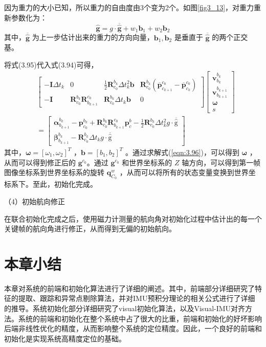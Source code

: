 因为重力的大小已知，所以重力的自由度由3个变为2个。如图\ref{fig3_13}，对重力重新参数化为：
\begin{equation}
\label{eqn:3.95}
\hat{\mathbf{g}} = g \cdot \overline{\hat{\mathbf{g}}} +w_{1} \mathbf{b}_{1}+w_{2} \mathbf{b}_{2}
\end{equation}
其中，$\overline{\hat{\mathbf{g}}} $ 为上一步估计出来的重力的方向向量，$\mathbf{b}_1, \mathbf{b}_2 $ 是垂直于 $\overline{\hat{\mathbf{g}}} $ 的两个正交基。

将式(3.95)代入式(3.94)可得，
\begin{equation}
\label{eqn:3.96}
\begin{aligned}
& \left[ \begin{array}{cccc}
- \mathbf{I} \Delta t_{k} & 0 & \frac{1}{2} \mathbf{R}_{c_{0}}^{b_{k}} \Delta t_{k}^{2} \mathbf{b} & \mathbf{R}_{c_{0}}^{b_{k}}(\overline{\mathbf{p}}_{c_{k+1}}^{c_{0}}-\overline{\mathbf{p}}_{c_{k}}^{c_{0}}) \\
{- \mathbf{ I}} & {\mathbf{R}_{c_{0}}^{b_{k}} \mathbf{R}_{b_{k+1}}^{c_{0}}} & {\mathbf{R}_{c_{0}}^{b_{k}} \Delta t_{k}} \mathbf{b}  & {0}
\end{array}\right] 
\left[ \begin{array}{c}
{\mathbf{v}_{b_{k}}^{b_{k}}} \\ {\mathbf{v}_{b_{k+1}}^{b_{k+1}}} \\ \bm{\omega} \\s
\end{array}\right] \\
&=\left[ \begin{array}{c}
\bm{\alpha}_{b_{k+1}}^{b_{k}}-\mathbf{p}_{c_{0}}^{b_{k}} + \mathbf{R}^{b_k}_{c_0}\mathbf{R}_{b_{k+1}}^{c_{0}} \mathbf{p}_{c}^{b} -\frac{1}{2} \mathbf{R}_{c_{0}}^{b_{k}} \Delta t_{k}^{2} g \cdot \overline{\hat{\mathrm{g}}} \\
{\bm{\beta}_{b_{k+1}}^{b_{k}}} - \mathbf{R}_{c_{0}}^{b_{k}} \Delta t_{k} g\cdot \overline{\hat{\mathrm{g}}} 
\end{array}\right]
\end{aligned}
\end{equation}
其中，$\bm{\omega} =\left[\omega_{1}, \omega_{2}\right]^{T} $ ，$\mathbf{b} =\left[b_{1}, b_{2}\right]^{T} $ 。通过求解式(\ref{eqn:3.96})，可以得到 $\bm{\omega} $ ，从而可以得到修正后的 $\mathbf{g}^{c_{0}} $。通过 $\mathbf{g}^{c_{0}} $ 和世界坐标系的 $Z$ 轴方向，可以得到第一帧图像坐标系到世界坐标系的旋转 $\mathbf{q}_{C_{0}}^{w} $ ，从而可以将所有的状态变量变换到世界坐标系下。至此，初始化完成。

（4）初始航向修正

在联合初始化完成之后，使用磁力计测量的航向角对初始化过程中估计出的每一个关键帧的航向角进行修正，从而得到无偏的初始航向。
\section{本章小结}
本章对系统的前端和初始化算法进行了详细的阐述。其中，前端部分详细研究了特征的提取、跟踪和异常点剔除算法，并对IMU预积分理论的相关公式进行了详细的推导。系统初始化部分详细研究了visual初始化算法，以及Visual-IMU对齐方法。系统的前端和初始化在整个系统中占了很大的比重，前端和初始化的好坏影响后端非线性优化的精度，从而影响整个系统的定位精度。因此，一个良好的前端和初始化是实现系统高精度定位的基础。